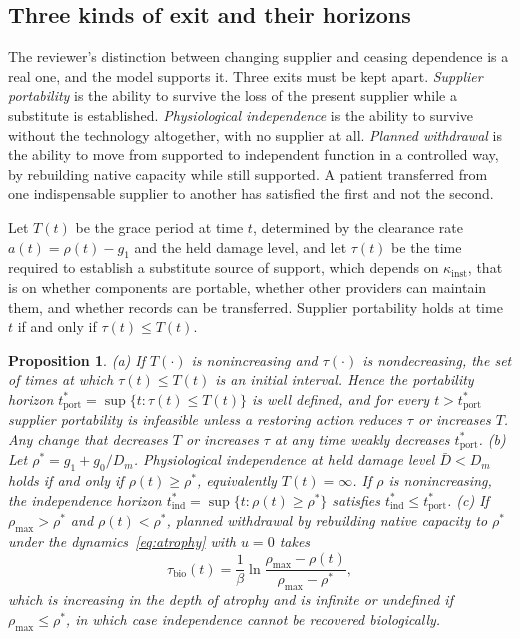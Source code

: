 \documentclass[11pt]{article}
\theoremstyle{plain}
\newtheorem{proposition}{Proposition}
\theoremstyle{definition}
\theoremstyle{remark}
\begin{document}
\subsection{Three kinds of exit and their horizons}

The reviewer's distinction between changing supplier and ceasing dependence is a real one, and the model supports it. Three exits must be kept apart. \emph{Supplier portability} is the ability to survive the loss of the present supplier while a substitute is established. \emph{Physiological independence} is the ability to survive without the technology altogether, with no supplier at all. \emph{Planned withdrawal} is the ability to move from supported to independent function in a controlled way, by rebuilding native capacity while still supported. A patient transferred from one indispensable supplier to another has satisfied the first and not the second.

Let $T(t)$ be the grace period at time $t$, determined by the clearance rate $a(t)=\rho(t)-g_1$ and the held damage level, and let $\tau(t)$ be the time required to establish a substitute source of support, which depends on $\kappa_{\mathrm{inst}}$, that is on whether components are portable, whether other providers can maintain them, and whether records can be transferred. Supplier portability holds at time $t$ if and only if $\tau(t)\le T(t)$.

\begin{proposition}\label{prop:horizon}
(a) If $T(\cdot)$ is nonincreasing and $\tau(\cdot)$ is nondecreasing, the set of times at which $\tau(t)\le T(t)$ is an initial interval. Hence the \emph{portability horizon} $t^\ast_{\mathrm{port}}=\sup\{t:\tau(t)\le T(t)\}$ is well defined, and for every $t>t^\ast_{\mathrm{port}}$ supplier portability is infeasible unless a restoring action reduces $\tau$ or increases $T$. Any change that decreases $T$ or increases $\tau$ at any time weakly decreases $t^\ast_{\mathrm{port}}$.
(b) Let $\rho^\ast=g_1+g_0/D_m$. Physiological independence at held damage level $\bar D<D_m$ holds if and only if $\rho(t)\ge\rho^\ast$, equivalently $T(t)=\infty$. If $\rho$ is nonincreasing, the \emph{independence horizon} $t^\ast_{\mathrm{ind}}=\sup\{t:\rho(t)\ge\rho^\ast\}$ satisfies $t^\ast_{\mathrm{ind}}\le t^\ast_{\mathrm{port}}$.
(c) If $\rho_{\max}>\rho^\ast$ and $\rho(t)<\rho^\ast$, planned withdrawal by rebuilding native capacity to $\rho^\ast$ under the dynamics~\eqref{eq:atrophy} with $u=0$ takes
\[
\tau_{\mathrm{bio}}(t)=\frac1\beta\ln\frac{\rho_{\max}-\rho(t)}{\rho_{\max}-\rho^\ast},
\]
which is increasing in the depth of atrophy and is infinite or undefined if $\rho_{\max}\le\rho^\ast$, in which case independence cannot be recovered biologically.
\end{proposition}
\end{document}
